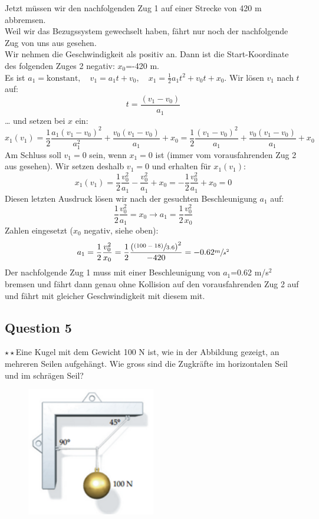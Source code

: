 \documentclass{article}
\begin{document}
Jetzt müssen wir den nachfolgenden Zug 1 auf einer Strecke von 420 m abbremsen.\\
Weil wir das Bezugssystem gewechselt haben, fährt nur noch der nachfolgende Zug von uns aus gesehen.\\Wir nehmen die Geschwindigkeit als positiv an. Dann ist die Start-Koordinate des folgenden Zuges 2 negativ: $x_0$=-420 m.\\
Es ist \( a_1 = \text{konstant}, \quad v_1 = a_1 t + v_0, \quad x_1 = \frac{1}{2} a_1 t^2 + v_0 t + x_0 \).
Wir lösen \( v_1 \) nach \( t \) auf:
\[
t = \frac{(v_1 - v_0)}{a_1}
\]
… und setzen bei \( x \) ein:
\[
x_1(v_1) = \frac{1}{2} \frac{a_1 (v_1 - v_0)^2}{a_1^2} + \frac{v_0 (v_1 - v_0)}{a_1} + x_0 = \frac{1}{2} \frac{(v_1 - v_0)^2}{a_1} + \frac{v_0 (v_1 - v_0)}{a_1} + x_0
\]
Am Schluss soll \( v_1 = 0 \) sein, wenn \( x_1 = 0 \) ist (immer vom vorausfahrenden Zug 2 aus gesehen). Wir setzen deshalb \( v_1 = 0 \) und erhalten für \( x_1(v_1) \):
\[
x_1(v_1) = \frac{1}{2} \frac{v_0^2}{a_1} - \frac{v_0^2}{a_1} + x_0 = -\frac{1}{2} \frac{v_0^2}{a_1} + x_0 = 0
\]
Diesen letzten Ausdruck lösen wir nach der gesuchten Beschleunigung \( a_1 \) auf:
\[
\frac{1}{2} \frac{v_0^2}{a_1} = x_0 \rightarrow a_1 = \frac{1}{2} \frac{v_0^2}{x_0}
\]
Zahlen eingesetzt ($x_0$ negativ, siehe oben):
\[a_1=\frac{1}{2}\frac{v_0^2}{x_0}=\frac{1}{2}\frac{{(\sfrac{(100-18)}{3.6})}^2}{-420}=-0.62\sfrac{m}{s^2}\]
Der nachfolgende Zug 1 muss mit einer Beschleunigung von $a_1$=0.62 m/s$^2$ bremsen und fährt dann genau ohne Kollision auf den vorausfahrenden Zug 2 auf und fährt mit gleicher Geschwindigkeit mit diesem mit.
\subsection*{Question 5}
$\star\star$Eine Kugel mit dem Gewicht 100 N ist, wie in der Abbildung gezeigt, an mehreren Seilen aufgehängt. Wie gross sind die Zugkräfte im horizontalen Seil und im schrägen Seil?
\begin{figure}[H]
    \centering
    \includegraphics[width=0.5\textwidth]{75.png}
    \label{fig:75}
    \end{figure}
\end{document}

